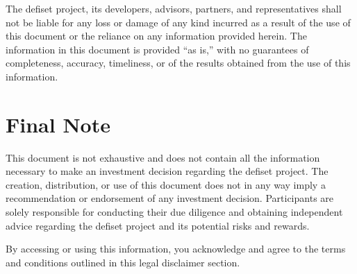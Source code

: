 \documentclass[11pt,oneside,a4paper]{article}
\begin{document}
The defiset project, its developers, advisors, partners, and representatives shall not be liable for any loss or damage of any kind incurred as a result of the use of this document or the reliance on any information provided herein. The information in this document is provided “as is,” with no guarantees of completeness, accuracy, timeliness, or of the results obtained from the use of this information.


\section{Final Note}

This document is not exhaustive and does not contain all the information necessary to make an investment decision regarding the defiset project. The creation, distribution, or use of this document does not in any way imply a recommendation or endorsement of any investment decision. Participants are solely responsible for conducting their due diligence and obtaining independent advice regarding the defiset project and its potential risks and rewards.

By accessing or using this information, you acknowledge and agree to the terms and conditions outlined in this legal disclaimer section.
\end{document}
